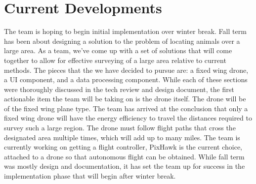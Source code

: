 \documentclass[onecolumn, draftclsnofoot,10pt, compsoc]{IEEEtran}
\begin{document}
\section{Current Developments}
The team is hoping to begin initial implementation over winter break. Fall term has been about designing a solution to the problem of locating animals over a large area. As a team, we've come up with a set of solutions that will come together to allow for effective surveying of a large area relative to current methods. The pieces that the we have decided to pursue are: a fixed wing drone, a UI component, and a data processing component. While each of these sections were thoroughly discussed in the tech review and design document, the first actionable item the team will be taking on is the drone itself.
\newline\newline
The drone will be of the fixed wing plane type. The team has arrived at the conclusion that only a fixed wing drone will have the energy efficiency to travel the distances required to survey such a large region. The drone must follow flight paths that cross the designated area multiple times, which will add up to many miles. The team is currently working on getting a flight controller, PixHawk is the current choice, attached to a drone so that autonomous flight can be obtained. While fall term was mostly design and documentation, it has set the team up for success in the implementation phase that will begin after winter break.
\end{document}

